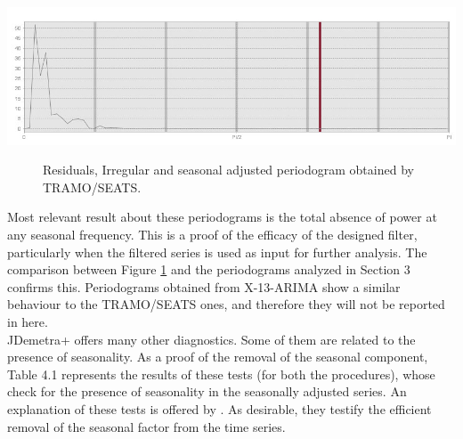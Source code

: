 \documentclass[english,blauw]{cbsdiscussionpaper}
\begin{document}
\includegraphics[width=\linewidth]{../images/capitolo4/TSsaper.jpg}
\begin{figure}[H]
\caption{Residuals, Irregular and seasonal adjusted periodogram obtained by TRAMO/SEATS.}
\label{fig:TSperr}
\end{figure}
Most relevant result about these periodograms is the total absence of power at any seasonal frequency. This is a proof of the efficacy of the designed filter, particularly when the filtered series is used as input for further analysis. The comparison between Figure \ref{fig:TSperr} and the periodograms analyzed in Section 3 confirms this. Periodograms obtained from X-13-ARIMA show a similar behaviour to the TRAMO/SEATS ones, and therefore they will not be reported in here.\\JDemetra+ offers many other diagnostics. Some of them are related to the presence of seasonality. As a proof of the removal of the seasonal component, Table 4.1 represents the results of these tests (for both the procedures), whose check for the presence of seasonality in the seasonally adjusted series. An explanation of these tests is offered by \citep{gru2015}. As desirable, they testify the efficient removal of the seasonal factor from the time series.
\end{document}
